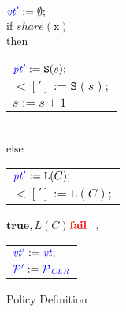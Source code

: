 \begin{figure}
\begin{minipage}{0.39\textwidth}
    \end{minipage}
    \begin{minipage}{0.22\textwidth}
                 {\(\vt['] := \emptyset;\) \\
                   if \(\mathit{share}(\mathtt{x})\) \\
                   then \begin{tabular}[t]{l}
                     \(\pt['] := \mathtt{S}(s);\) \\
                     \(\lt['] := \mathtt{S}(s);\) \\
                     \(s := s+1\)
                   \end{tabular} \\ 
                   else \begin{tabular}[t]{l}
                     \(\pt['] := \mathtt{L}(C);\) \\
                     \(\lt['] := \mathtt{L}(C);\) \\
                 \end{tabular}}
    \end{minipage}
    \begin{minipage}{0.38\textwidth}
                 {
                   {\(\mathbf{true},L(C)\)}{\(\fail\)}
                   {\(\underline{~~},\underline{~~}\)}{\begin{tabular}{l}
                       \(\vt['] := \vt;\) \\
                       \(\PCT['] := \PCT[_{CLR}]\) \\
                  \end{tabular}}}
    \end{minipage}

\caption{Policy Definition}
\label{ch5:fig:policy}

\end{figure}

